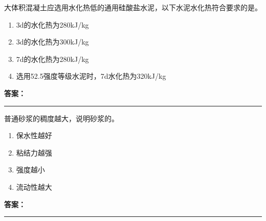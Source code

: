 \documentclass[UTF8,fontset=fandol,11pt]{ctexart}
\newcommand{\answerline}{\textcolor{answerred}{\rule{2.4cm}{0.7pt}}}
\begin{document}
\begin{quizbox}[title={乱序第 48 题｜第四章混凝土结构工程}]

大体积混凝土应选用水化热低的通用硅酸盐水泥，以下水泥水化热符合要求的是。\\

\begin{enumerate}[label=\Alph*.]

\item 3d的水化热为280kJ/kg

\item 3d的水化热为300kJ/kg

\item 7d的水化热为280kJ/kg

\item 选用52.5强度等级水泥时，7d水化热为320kJ/kg

\end{enumerate}

\textbf{\textcolor{answerred}{答案：}} \answerline

\end{quizbox}

\vspace{0.2em}

\begin{quizbox}[title={乱序第 49 题｜第六章砌筑工程}]

普通砂浆的稠度越大，说明砂浆的。\\

\begin{enumerate}[label=\Alph*.]

\item 保水性越好

\item 粘结力越强

\item 强度越小

\item 流动性越大

\end{enumerate}

\textbf{\textcolor{answerred}{答案：}} \answerline

\end{quizbox}

\vspace{0.2em}
\end{document}
